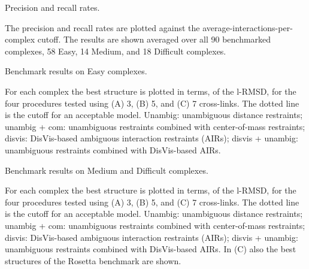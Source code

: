 \caption{Precision and recall rates.}
{The precision and recall rates are plotted against the
average-interactions-per-complex cutoff. The results are shown averaged over
all 90 benchmarked complexes, 58 Easy, 14 Medium, and 18 Difficult complexes.}
\stopbuffer


\caption{Benchmark results on Easy complexes.}
{For each complex the best structure is plotted in terms, of the l-RMSD, for
the four procedures tested using (A) 3, (B) 5, and (C) 7 cross-links. The
dotted line is the cutoff for an acceptable model. Unambig: unambiguous
distance restraints; unambig + com: unambiguous restraints combined with
center-of-mass restraints; disvis: DisVis-based ambiguous interaction
restraints (AIRs); disvis + unambig: unambiguous restraints combined with
DisVis-based AIRs.} 
\stopbuffer


\caption{Benchmark results on Medium and Difficult complexes.}
{For each complex the best structure is plotted in terms, of the l-RMSD, for
the four procedures tested using (A) 3, (B) 5, and (C) 7 cross-links. The
dotted line is the cutoff for an acceptable model. Unambig: unambiguous
distance restraints; unambig + com: unambiguous restraints combined with
center-of-mass restraints; disvis: DisVis-based ambiguous interaction
restraints (AIRs); disvis + unambig: unambiguous restraints combined with
DisVis-based AIRs. In (C) also the best structures of the Rosetta benchmark are
shown.}
\stopbuffer
